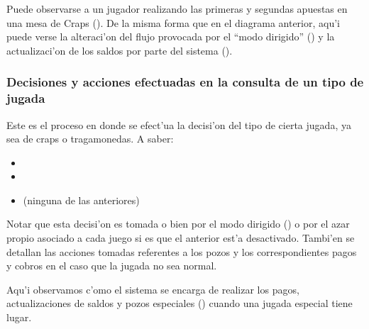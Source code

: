 
Puede observarse a un jugador realizando las primeras y segundas apuestas en una mesa de Craps ().
De la misma forma que en el diagrama anterior, aqu'i puede verse la alteraci'on del flujo provocada por el ``modo dirigido'' () y la actualizaci'on de los saldos por parte del sistema ().

\clearpage





\subsubsection{Decisiones y acciones efectuadas en la consulta de un tipo de jugada}
Este es el proceso en donde se efect'ua la decisi'on del tipo de cierta jugada, ya sea de craps o tragamonedas. A saber:

\begin{itemize}
  \item {}
  \item {} 
  \item {} (ninguna de las anteriores)
\end{itemize}

Notar que esta decisi'on es tomada o bien por el modo dirigido () o por el azar propio asociado a cada juego si es que el anterior est'a desactivado. Tambi'en se detallan las acciones tomadas referentes a los pozos y los correspondientes pagos y cobros en el caso que la jugada no sea normal.


Aqu'i observamos c'omo el sistema se encarga de realizar los pagos, actualizaciones de saldos y pozos especiales () cuando una jugada especial tiene lugar.
